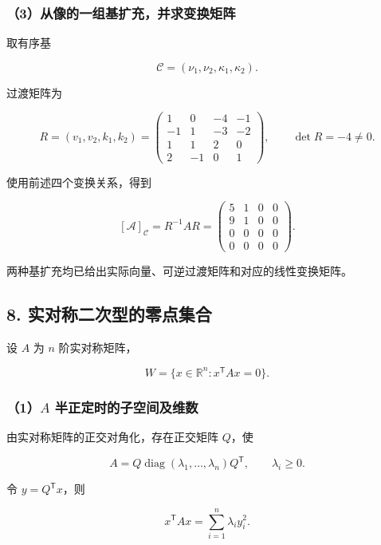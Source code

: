 \documentclass[11pt,fontset=fandol]{ctexart}
\begin{document}
\subsubsection{（3）从像的一组基扩充，并求变换矩阵}\label{ux4eceux50cfux7684ux4e00ux7ec4ux57faux6269ux5145ux5e76ux6c42ux53d8ux6362ux77e9ux9635}

取有序基

\[
\mathcal C=(\nu_1,\nu_2,\kappa_1,\kappa_2).
\]

过渡矩阵为

\[
R=(v_1,v_2,k_1,k_2)
=\begin{pmatrix}
1&0&-4&-1\\
-1&1&-3&-2\\
1&1&2&0\\
2&-1&0&1
\end{pmatrix},\qquad\det R=-4\ne0.
\]

使用前述四个变换关系，得到

\[
\boxed{[\mathcal A]_{\mathcal C}=R^{-1}AR
=\begin{pmatrix}
5&1&0&0\\
9&1&0&0\\
0&0&0&0\\
0&0&0&0
\end{pmatrix}}.
\]

两种基扩充均已给出实际向量、可逆过渡矩阵和对应的线性变换矩阵。

\subsection{8.
实对称二次型的零点集合}\label{ux5b9eux5bf9ux79f0ux4e8cux6b21ux578bux7684ux96f6ux70b9ux96c6ux5408}

设 \(A\) 为 \(n\) 阶实对称矩阵，

\[
W=\{x\in\mathbb R^n:x^{\mathsf T}Ax=0\}.
\]

\subsubsection{\texorpdfstring{（1）\(A\)
半正定时的子空间及维数}{（1）A 半正定时的子空间及维数}}\label{a-ux534aux6b63ux5b9aux65f6ux7684ux5b50ux7a7aux95f4ux53caux7ef4ux6570}

由实对称矩阵的正交对角化，存在正交矩阵 \(Q\)，使

\[
A=Q\operatorname{diag}(\lambda_1,\ldots,\lambda_n)Q^{\mathsf T},
\qquad\lambda_i\ge0.
\]

令 \(y=Q^{\mathsf T}x\)，则

\[
x^{\mathsf T}Ax=\sum_{i=1}^n\lambda_i y_i^2.
\]
\end{document}
